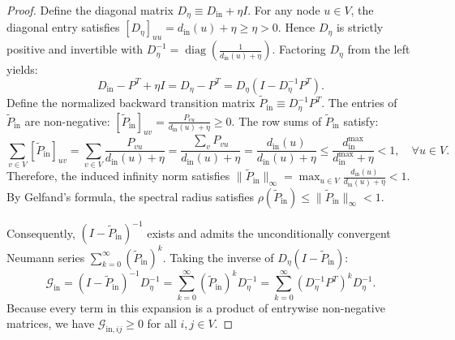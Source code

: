 \documentclass[11pt,a4paper]{article}
\begin{document}
\begin{proof}
Define the diagonal matrix $D_\eta \equiv D_{\text{in}} + \eta I$. For any node $u \in V$, the diagonal entry satisfies $[D_\eta]_{uu} = d_{\text{in}}(u) + \eta \ge \eta > 0$. Hence $D_\eta$ is strictly positive and invertible with $D_\eta^{-1} = \operatorname{diag}\left( \frac{1}{d_{\text{in}}(u) + \eta} \right)$. Factoring $D_\eta$ from the left yields:
\begin{equation}
D_{\text{in}} - P^T + \eta I = D_\eta - P^T = D_\eta \left( I - D_\eta^{-1} P^T \right).
\end{equation}
Define the normalized backward transition matrix $\widetilde{P}_{\text{in}} \equiv D_\eta^{-1} P^T$. The entries of $\widetilde{P}_{\text{in}}$ are non-negative: $[\widetilde{P}_{\text{in}}]_{uv} = \frac{P_{vu}}{d_{\text{in}}(u) + \eta} \ge 0$. The row sums of $\widetilde{P}_{\text{in}}$ satisfy:
\begin{equation}
\sum_{v \in V} [\widetilde{P}_{\text{in}}]_{uv} = \sum_{v \in V} \frac{P_{vu}}{d_{\text{in}}(u) + \eta} = \frac{\sum_v P_{vu}}{d_{\text{in}}(u) + \eta} = \frac{d_{\text{in}}(u)}{d_{\text{in}}(u) + \eta} \le \frac{d_{\text{in}}^{\max}}{d_{\text{in}}^{\max} + \eta} < 1, \quad \forall u \in V.
\end{equation}
Therefore, the induced infinity norm satisfies $\|\widetilde{P}_{\text{in}}\|_\infty = \max_{u \in V} \frac{d_{\text{in}}(u)}{d_{\text{in}}(u) + \eta} < 1$. By Gelfand's formula, the spectral radius satisfies $\rho(\widetilde{P}_{\text{in}}) \le \|\widetilde{P}_{\text{in}}\|_\infty < 1$.

Consequently, $(I - \widetilde{P}_{\text{in}})^{-1}$ exists and admits the unconditionally convergent Neumann series $\sum_{k=0}^\infty (\widetilde{P}_{\text{in}})^k$. Taking the inverse of $D_\eta (I - \widetilde{P}_{\text{in}})$:
\begin{equation}
\mathcal{G}_{\text{in}} = \left( I - \widetilde{P}_{\text{in}} \right)^{-1} D_\eta^{-1} = \sum_{k=0}^\infty (\widetilde{P}_{\text{in}})^k D_\eta^{-1} = \sum_{k=0}^\infty (D_\eta^{-1} P^T)^k D_\eta^{-1}.
\end{equation}
Because every term in this expansion is a product of entrywise non-negative matrices, we have $\mathcal{G}_{\text{in}, ij} \ge 0$ for all $i, j \in V$.


\end{proof}
\end{document}

